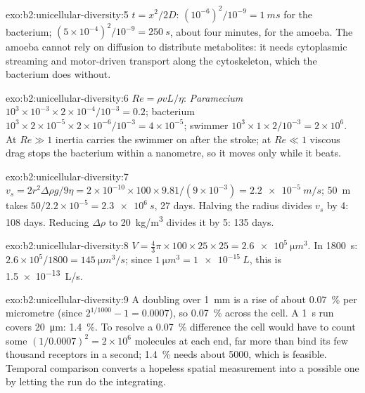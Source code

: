 \begin{solution}{exo:b2:unicellular-diversity:5}
$t = x^2/2D$: $(10^{-6})^2/10^{-9} = \qty{1}{ms}$ for the bacterium;
$(5\times 10^{-4})^2/10^{-9} = \qty{250}{s}$, about four minutes,
for the amoeba. The amoeba cannot rely on diffusion to distribute
metabolites: it needs cytoplasmic streaming and motor-driven
transport along the cytoskeleton, which the bacterium does without.
\end{solution}

\begin{solution}{exo:b2:unicellular-diversity:6}
$Re = \rho vL/\eta$: \emph{Paramecium} $10^3\times 10^{-3}\times
2\times 10^{-4}/10^{-3} = 0.2$; bacterium $10^3\times 2\times
10^{-5}\times 2\times 10^{-6}/10^{-3} = 4\times 10^{-5}$; swimmer
$10^3\times 1\times 2/10^{-3} = 2\times 10^6$. At $Re \gg 1$ inertia
carries the swimmer on after the stroke; at $Re \ll 1$ viscous drag
stops the bacterium within a nanometre, so it moves only while it
beats.
\end{solution}

\begin{solution}{exo:b2:unicellular-diversity:7}
$v_s = 2r^2\Delta\rho g/9\eta = 2\times 10^{-10}\times 100\times
9.81/(9\times 10^{-3}) = \qty{2.2e-5}{m/s}$; \qty{50}{m} takes
$50/2.2\times 10^{-5} = \qty{2.3e6}{s}$, 27 days. Halving the radius
divides $v_s$ by 4: 108 days. Reducing $\Delta\rho$ to
\qty{20}{kg/m^3} divides it by 5: 135 days.
\end{solution}

\begin{solution}{exo:b2:unicellular-diversity:8}
$V = \tfrac{4}{3}\pi\times 100\times 25\times 25 =
\qty{2.6e5}{\micro m^3}$. In \qty{1800}{s}: $2.6\times 10^5/1800 =
\qty{145}{\micro m^3/s}$; since $\qty{1}{\micro m^3} =
\qty{1e-15}{L}$, this is \qty{1.5e-13}{L/s}.
\end{solution}

\begin{solution}{exo:b2:unicellular-diversity:9}
A doubling over \qty{1}{mm} is a rise of about \qty{0.07}{\%} per
micrometre (since $2^{1/1000} - 1 = 0.0007$), so \qty{0.07}{\%}
across the cell. A \qty{1}{s} run covers \qty{20}{\micro m}:
\qty{1.4}{\%}. To resolve a \qty{0.07}{\%} difference the cell would
have to count some $(1/0.0007)^2 = 2\times 10^6$ molecules at each
end, far more than bind its few thousand receptors in a second;
\qty{1.4}{\%} needs about \num{5000}, which is feasible. Temporal
comparison converts a hopeless spatial measurement into a possible
one by letting the run do the integrating.
\end{solution}

